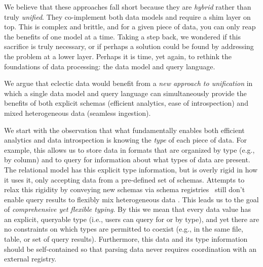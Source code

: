 We believe that these approaches fall short because they are {\em hybrid} rather than truly {\em unified}. They co-implement both data models and require a shim layer on top. This is complex and brittle, and for a given piece of data, you can only reap the benefits of one model at a time. Taking a step back, we wondered if this sacrifice is truly necessary, or if perhaps a solution could be found by addressing the problem at a lower layer. Perhaps it is time, yet again, to rethink the foundations of data processing: the data model and query language.

We argue that eclectic data would benefit from a {\em new approach to unification} in which a single data model and query language can simultaneously provide the benefits of both explicit schemas (efficient analytics, ease of introspection) and mixed heterogeneous data (seamless ingestion).%

We start with the observation that what fundamentally enables both efficient analytics and data introspection is knowing the {\em type} of each piece of data. For example, this allows us to store data in formats that are organized by type (e.g., by column) and to query for information about what types of data are present. The relational model has this explicit type information, but is overly rigid in how it uses it, only accepting data from a pre-defined set of schemas. Attempts to relax this rigidity by conveying new schemas via schema registries~\cite{confluent_schema_registry} still don't enable query results to flexibly mix heterogeneous data . This leads us to the goal of {\em comprehensive yet flexible typing}. By this we mean that every data value has an explicit, queryable type (i.e., users can query for or by type), and yet there are no constraints on which types are permitted to coexist (e.g., in the same file, table, or set of query results). Furthermore, this data and its type information should be self-contained so that parsing data never requires coordination with an external registry. 

